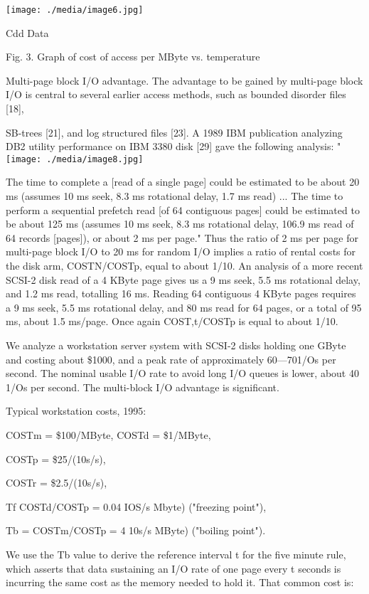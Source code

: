 \documentclass[a4paper,11pt,notitlepage,twoside,openright]{article}
\begin{document}
\texttt{[image: ./media/image6.jpg]}

Cdd Data

Fig. 3. Graph of cost of access per MByte vs. temperature

Multi-page block I/O advantage. The advantage to be gained by multi-page
block I/O is central to several earlier access methods, such as bounded
disorder files {[}18{]},

SB-trees {[}21{]}, and log structured files {[}23{]}. A 1989 IBM
publication analyzing DB2 utility performance on IBM 3380 disk {[}29{]}
gave the following analysis:
"\texttt{[image: ./media/image8.jpg]}

The time to complete a {[}read of a single page{]} could be estimated to
be about 20 ms (assumes 10 ms seek, 8.3 ms rotational delay, 1.7 ms
read) ... The time to perform a sequential prefetch read {[}of 64
contiguous pages{]} could be estimated to be about 125 ms (assumes 10 ms
seek, 8.3 ms rotational delay, 106.9 ms read of 64 records {[}pages{]}),
or about 2 ms per page." Thus the ratio of 2 ms per page for multi-page
block I/O to 20 ms for random I/O implies a ratio of rental costs for
the disk arm, COSTN/COSTp, equal to about 1/10. An analysis of a more
recent SCSI-2 disk read of a 4 KByte page gives us a 9 ms seek, 5.5 ms
rotational delay, and 1.2 ms read, totalling 16 ms. Reading 64
contiguous 4 KByte pages requires a 9 ms seek, 5.5 ms rotational delay,
and 80 ms read for 64 pages, or a total of 95 ms, about 1.5 ms/page.
Once again COST,t/COSTp is equal to about 1/10.

We analyze a workstation server system with SCSI-2 disks holding one
GByte and costing about \$1000, and a peak rate of approximately
60---701/Os per second. The nominal usable I/O rate to avoid long I/O
queues is lower, about 40 1/Os per second. The multi-block I/O advantage
is significant.

Typical workstation costs, 1995:

COSTm = \$100/MByte, COSTd = \$1/MByte,

COSTp = \$25/(10s/s),

COSTr = \$2.5/(10s/s),

Tf COSTd/COSTp = 0.04 IOS/s Mbyte) ("freezing point"),

Tb = COSTm/COSTp = 4 10s/s MByte) ("boiling point").

We use the Tb value to derive the reference interval t for the five
minute rule, which asserts that data sustaining an I/O rate of one page
every t seconds is incurring the same cost as the memory needed to hold
it. That common cost is:
\end{document}
